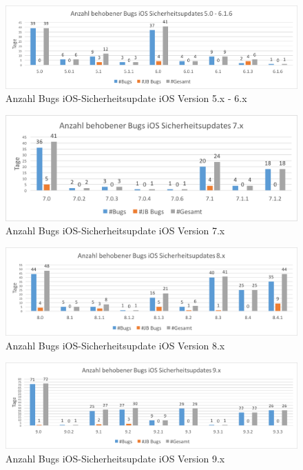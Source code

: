 \begin{figure}[htbp]
        \centering
                \includegraphics[scale=0.55]{Bilder/iOSSicherheitsupdate5.png}
        \caption{Anzahl Bugs iOS-Sicherheitsupdate iOS Version 5.x - 6.x}
        \label{fig:AnalyseiOSSicherheitsupdate5}
\end{figure}

\begin{figure}[htbp]
        \centering
                \includegraphics[scale=0.7]{Bilder/iOSSicherheitsupdate7.png}
        \caption{Anzahl Bugs iOS-Sicherheitsupdate iOS Version 7.x}
        \label{fig:AnalyseiOSSicherheitsupdate7}
\end{figure}

\begin{figure}[htbp]
        \centering
                \includegraphics[scale=0.6]{Bilder/iOSSicherheitsupdate8.png}
        \caption{Anzahl Bugs iOS-Sicherheitsupdate iOS Version 8.x}
        \label{fig:AnalyseiOSSicherheitsupdate8}
\end{figure}

\begin{figure}[htbp]
        \centering
                \includegraphics[scale=0.55]{Bilder/iOSSicherheitsupdate9.png}
        \caption{Anzahl Bugs iOS-Sicherheitsupdate iOS Version 9.x}
        \label{fig:AnalyseiOSSicherheitsupdate9}
\end{figure}


